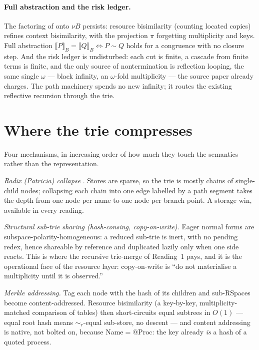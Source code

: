 \documentclass[11pt]{article}
\makeatletter
\theoremstyle{plain}
\theoremstyle{definition}
\newcommand{\den}[1]{\llbracket #1 \rrbracket}
\newcommand{\Name}{\mathrm{Name}}
\newcommand{\Proc}{\mathrm{Proc}}
\newcommand{\quo}{@}
\newcommand{\bisr}{\sim_{r}}
\newcommand{\bis}{\sim}
\makeatother
\begin{document}
\paragraph{Full abstraction and the risk ledger.}
The factoring of \cite{KnotRho} onto $\nu B$ persists: resource bisimilarity (counting located
copies) refines context bisimilarity, with the projection $\pi$ forgetting multiplicity and keys.
Full abstraction $\den{P}_{B}=\den{Q}_{B}\Leftrightarrow P\bis Q$ holds for a congruence with no
closure step. And the risk ledger is undisturbed: each cut is finite, a cascade from finite terms is
finite, and the only source of nontermination is reflection looping, the same single $\omega$ ---
black infinity, an $\omega$-fold multiplicity --- the source paper already charges. The path machinery
spends no new infinity; it routes the existing reflective recursion through the trie.

\section{Where the trie compresses}\label{sec:compress}

Four mechanisms, in increasing order of how much they touch the semantics rather than the
representation.

\emph{Radix (Patricia) collapse} \cite{Morrison68}. Stores are sparse, so the trie is mostly chains
of single-child nodes; collapsing each chain into one edge labelled by a path segment takes the depth
from one node per name to one node per branch point. A storage win, available in every reading.

\emph{Structural sub-trie sharing (hash-consing, copy-on-write).} Eager normal forms are
subspace-polarity-homogeneous: a reduced sub-trie is inert, with no pending redex, hence shareable by
reference and duplicated lazily only when one side reacts. This is where the recursive trie-merge of
Reading~1 pays, and it is the operational face of the resource layer: copy-on-write is ``do not
materialise a multiplicity until it is observed.''

\emph{Merkle addressing.} Tag each node with the hash of its children and sub-RSpaces become
content-addressed. Resource bisimilarity (a key-by-key, multiplicity-matched comparison of tables)
then short-circuits equal subtrees in $O(1)$ --- equal root hash means $\bisr$-equal sub-store, no
descent --- and content addressing is native, not bolted on, because $\Name=\quo\Proc$: the key
already \emph{is} a hash of a quoted process.
\end{document}
